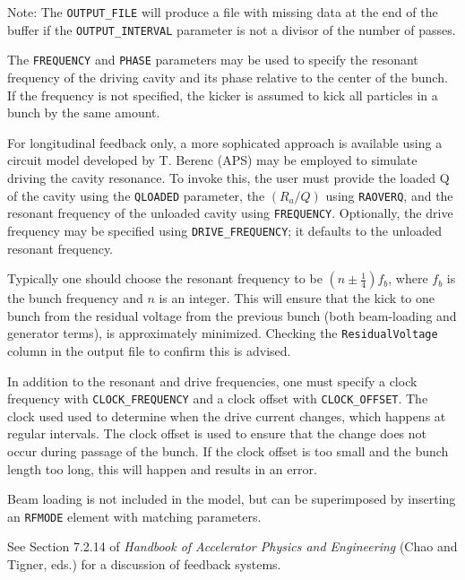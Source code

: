 Note: The \verb|OUTPUT_FILE| will produce a file with missing data at the end of
the buffer if the \verb|OUTPUT_INTERVAL| parameter is not a divisor of the number of passes.

The \verb|FREQUENCY| and \verb|PHASE| parameters may be used to specify the resonant frequency of 
the driving cavity and its phase relative to the center of the bunch.
If the frequency is not specified, the kicker is assumed to kick all particles in a bunch by the
same amount.

For longitudinal feedback only, a more sophicated approach is available using a
circuit model developed by T. Berenc (APS) may be employed to simulate driving the cavity resonance.
To invoke this, the user must provide the loaded Q of the cavity using the \verb|QLOADED| parameter,
the $(R_a/Q)$ using \verb|RAOVERQ|, and the resonant frequency of the unloaded 
cavity using \verb|FREQUENCY|. Optionally, the drive frequency may be specified using
\verb|DRIVE_FREQUENCY|; it defaults to the unloaded resonant frequency.

Typically one should choose the resonant frequency to be $(n\pm \frac{1}{4})f_b$, where
$f_b$ is the bunch frequency and $n$ is an integer.
This will ensure that the kick to one bunch from the residual voltage from the previous
bunch (both beam-loading and generator terms), is approximately minimized.
Checking the \verb|ResidualVoltage| column in the output file to confirm this is advised.

In addition to the resonant and drive frequencies, one must specify a clock frequency with
\verb|CLOCK_FREQUENCY| and a clock offset with \verb|CLOCK_OFFSET|. The clock used used to
determine when the drive current changes, which happens at regular intervals. The clock offset is used to 
ensure that the change does not occur during passage of the bunch. If the clock offset is too small and
the bunch length too long, this will happen and results in an error.

Beam loading is not included in the model, but can be superimposed by inserting an \verb|RFMODE| element
with matching parameters.


See Section 7.2.14 of {\em Handbook of Accelerator Physics and Engineering}
(Chao and Tigner, eds.) for a discussion of feedback systems.
